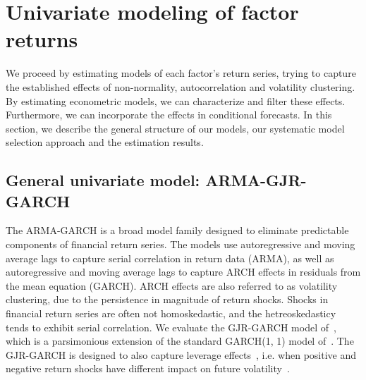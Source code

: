 
\section{Univariate modeling of factor returns} %
\label{sec:univariate_modeling}

We proceed by estimating models of each factor's return series, trying to capture the established effects of non-normality, autocorrelation and volatility clustering. By estimating econometric models, we can characterize and filter these effects. Furthermore, we can incorporate the effects in conditional forecasts. In this section, we describe the general structure of our models, our systematic model selection approach and the estimation results.

\subsection{General univariate model: ARMA-GJR-GARCH} %
\label{sub:general_univariate_model_gjr_garch}

The ARMA-GARCH is a broad model family designed to eliminate predictable components of financial return series. The models use autoregressive and moving average lags to capture serial correlation in return data (ARMA), as well as autoregressive and moving average lags to capture ARCH effects in residuals from the mean equation (GARCH). ARCH effects are also referred to as volatility clustering, due to the persistence in magnitude of return shocks. Shocks in financial return series are often not homoskedastic, and the hetreoskedasticy tends to exhibit serial correlation. We evaluate the GJR-GARCH model of~\textcite{glosten1993relation}, which is a parsimonious extension of the standard GARCH(1, 1) model of~\autocite{Bollerslev1986}. The GJR-GARCH is designed to also capture leverage effects~\autocite{glosten1993relation}, i.e. when positive and negative return shocks have different impact on future volatility~\autocite{Black1976}.

